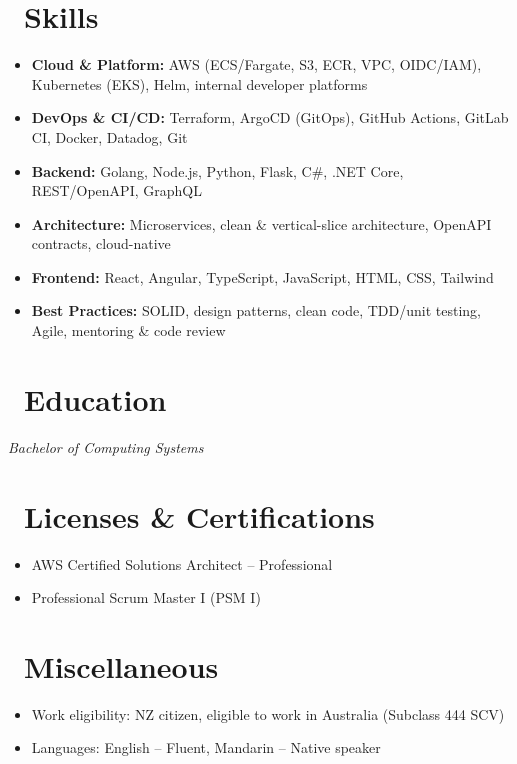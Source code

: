 \documentclass{resume}
\begin{document}
\section{\faCogs\ Skills}
\begin{itemize}[parsep=0.5ex]
  \item \textbf{Cloud \& Platform:} AWS (ECS/Fargate, S3, ECR, VPC, OIDC/IAM), Kubernetes (EKS), Helm, internal developer platforms
  \item \textbf{DevOps \& CI/CD:} Terraform, ArgoCD (GitOps), GitHub Actions, GitLab CI, Docker, Datadog, Git
  \item \textbf{Backend:} Golang, Node.js, Python, Flask, C\#, .NET Core, REST/OpenAPI, GraphQL
  \item \textbf{Architecture:} Microservices, clean \& vertical-slice architecture, OpenAPI contracts, cloud-native
  \item \textbf{Frontend:} React, Angular, TypeScript, JavaScript, HTML, CSS, Tailwind
  \item \textbf{Best Practices:} SOLID, design patterns, clean code, TDD/unit testing, Agile, mentoring \& code review
\end{itemize}

\section{\faGraduationCap\ Education}
\textit{Bachelor of Computing Systems}

\section{\faHeartO\ Licenses \& Certifications}
\begin{itemize}[parsep=0.5ex]
  \item AWS Certified Solutions Architect – Professional
  \item Professional Scrum Master I (PSM I)
\end{itemize}


\section{\faInfo\ Miscellaneous}
\begin{itemize}[parsep=0.5ex]
  \item Work eligibility: NZ citizen, eligible to work in Australia (Subclass 444 SCV)
  \item Languages: English – Fluent, Mandarin – Native speaker
\end{itemize}
\end{document}
